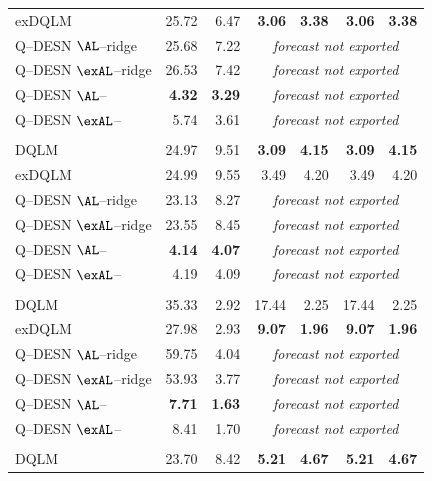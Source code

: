 \begin{longtable}{@{}lrrrrrr@{}}
exDQLM & 25.72 & 6.47 & \textbf{3.06} & \textbf{3.38} & \textbf{3.06} & \textbf{3.38} \\
Q--DESN \(\AL\)--ridge & 25.68 & 7.22 & \multicolumn{4}{c}{\emph{forecast not exported}} \\
Q--DESN \(\exAL\)--ridge & 26.53 & 7.42 & \multicolumn{4}{c}{\emph{forecast not exported}} \\
Q--DESN \(\AL\)--\RHS{} & \textbf{4.32} & \textbf{3.29} & \multicolumn{4}{c}{\emph{forecast not exported}} \\
Q--DESN \(\exAL\)--\RHS{} & 5.74 & 3.61 & \multicolumn{4}{c}{\emph{forecast not exported}} \\
\addlinespace[0.25em]
\multicolumn{7}{@{}l}{\emph{Gaussian errors, $\tau = 0.50$}}\\
DQLM & 24.97 & 9.51 & \textbf{3.09} & \textbf{4.15} & \textbf{3.09} & \textbf{4.15} \\
exDQLM & 24.99 & 9.55 & 3.49 & 4.20 & 3.49 & 4.20 \\
Q--DESN \(\AL\)--ridge & 23.13 & 8.27 & \multicolumn{4}{c}{\emph{forecast not exported}} \\
Q--DESN \(\exAL\)--ridge & 23.55 & 8.45 & \multicolumn{4}{c}{\emph{forecast not exported}} \\
Q--DESN \(\AL\)--\RHS{} & \textbf{4.14} & \textbf{4.07} & \multicolumn{4}{c}{\emph{forecast not exported}} \\
Q--DESN \(\exAL\)--\RHS{} & 4.19 & 4.09 & \multicolumn{4}{c}{\emph{forecast not exported}} \\
\addlinespace[0.25em]
\multicolumn{7}{@{}l}{\emph{Laplace errors, $\tau = 0.05$}}\\
DQLM & 35.33 & 2.92 & 17.44 & 2.25 & 17.44 & 2.25 \\
exDQLM & 27.98 & 2.93 & \textbf{9.07} & \textbf{1.96} & \textbf{9.07} & \textbf{1.96} \\
Q--DESN \(\AL\)--ridge & 59.75 & 4.04 & \multicolumn{4}{c}{\emph{forecast not exported}} \\
Q--DESN \(\exAL\)--ridge & 53.93 & 3.77 & \multicolumn{4}{c}{\emph{forecast not exported}} \\
Q--DESN \(\AL\)--\RHS{} & \textbf{7.71} & \textbf{1.63} & \multicolumn{4}{c}{\emph{forecast not exported}} \\
Q--DESN \(\exAL\)--\RHS{} & 8.41 & 1.70 & \multicolumn{4}{c}{\emph{forecast not exported}} \\
\addlinespace[0.25em]
\multicolumn{7}{@{}l}{\emph{Laplace errors, $\tau = 0.25$}}\\
DQLM & 23.70 & 8.42 & \textbf{5.21} & \textbf{4.67} & \textbf{5.21} & \textbf{4.67} \\

\end{longtable}
